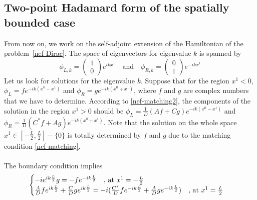 \subsection{Two-point Hadamard form of the spatially bounded case}
From now on, we work on the self-adjoint extension of the Hamiltonian of the problem~\cref{nef-Dirac}.
The space of eigenvectors for eigenvalue $k$ is spanned by
\begin{equation}\label{nef-basisSol}
\phi_{L,k} = 
\begin{pmatrix}
1 \\
0
\end{pmatrix} e^{ikx^1} \quad \textrm{and} \quad
\phi_{R,k} = 
\begin{pmatrix}
0 \\
1
\end{pmatrix} e^{-ikx^1}
\end{equation}
%
Let us look for solutions for the eigenvalue $k$.
Suppose that for the region $x^1<0$, 
 $\phi_L = f e^{-ik(x^0 - x^1)}$ and $\phi_R = g e^{-ik(x^0+x^1)}$, where $f$ and $g$ are complex numbers that we have to determine. 
According to \cref{nef-matching2}, the components of the solution in the region $x^1 > 0$ should be $\phi_L = \frac{1}{D} (Af+Cg) e^{-ik(x^0 - x^1)}$ and $\phi_R = \frac{1}{D}(C^* f + Ag ) e^{-ik(x^0 + x^1)}$. 
Note that the solution on the whole space $x^1 \in [-\frac{L}{2}, \frac{L}{2}] - \{0\}$ is totally determined by $f$ and $g$ due to the matching condition \cref{nef-matching}. \\\\
The boundary condition implies
\begin{equation}
\begin{cases}
-i e^{ik \frac{L}{2}} g = -f e^{-ik \frac{L}{2}}  \quad \textrm{, at $ x^1 = -\frac{L}{2}$}  \\
\frac{A}{D} f e^{ik \frac{L}{2}} + \frac{C}{D} g e^{ik \frac{L}{2}} = -i (\frac{C^*}{D} f e^{-ik \frac{L}{2}} + \frac{A}{D} g e^{-ik \frac{L}{2}})   \quad \textrm{, at $x^1 = \frac{L}{2}$}
\end{cases}
\end{equation}
